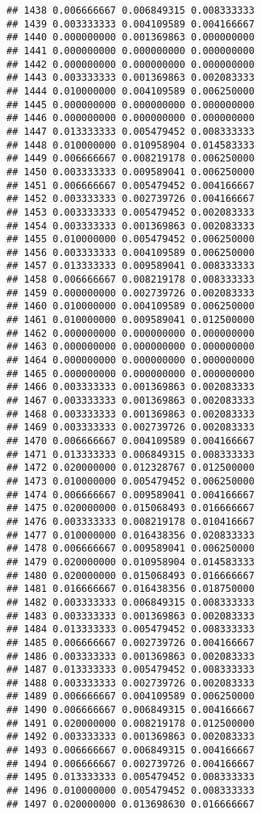 \documentclass[
]{article}
\begin{document}
\begin{verbatim}
## 1438 0.006666667 0.006849315 0.008333333
## 1439 0.003333333 0.004109589 0.004166667
## 1440 0.000000000 0.001369863 0.000000000
## 1441 0.000000000 0.000000000 0.000000000
## 1442 0.000000000 0.000000000 0.000000000
## 1443 0.003333333 0.001369863 0.002083333
## 1444 0.010000000 0.004109589 0.006250000
## 1445 0.000000000 0.000000000 0.000000000
## 1446 0.000000000 0.000000000 0.000000000
## 1447 0.013333333 0.005479452 0.008333333
## 1448 0.010000000 0.010958904 0.014583333
## 1449 0.006666667 0.008219178 0.006250000
## 1450 0.003333333 0.009589041 0.006250000
## 1451 0.006666667 0.005479452 0.004166667
## 1452 0.003333333 0.002739726 0.004166667
## 1453 0.003333333 0.005479452 0.002083333
## 1454 0.003333333 0.001369863 0.002083333
## 1455 0.010000000 0.005479452 0.006250000
## 1456 0.003333333 0.004109589 0.006250000
## 1457 0.013333333 0.009589041 0.008333333
## 1458 0.006666667 0.008219178 0.008333333
## 1459 0.000000000 0.002739726 0.002083333
## 1460 0.010000000 0.004109589 0.006250000
## 1461 0.010000000 0.009589041 0.012500000
## 1462 0.000000000 0.000000000 0.000000000
## 1463 0.000000000 0.000000000 0.000000000
## 1464 0.000000000 0.000000000 0.000000000
## 1465 0.000000000 0.000000000 0.000000000
## 1466 0.003333333 0.001369863 0.002083333
## 1467 0.003333333 0.001369863 0.002083333
## 1468 0.003333333 0.001369863 0.002083333
## 1469 0.003333333 0.002739726 0.002083333
## 1470 0.006666667 0.004109589 0.004166667
## 1471 0.013333333 0.006849315 0.008333333
## 1472 0.020000000 0.012328767 0.012500000
## 1473 0.010000000 0.005479452 0.006250000
## 1474 0.006666667 0.009589041 0.004166667
## 1475 0.020000000 0.015068493 0.016666667
## 1476 0.003333333 0.008219178 0.010416667
## 1477 0.010000000 0.016438356 0.020833333
## 1478 0.006666667 0.009589041 0.006250000
## 1479 0.020000000 0.010958904 0.014583333
## 1480 0.020000000 0.015068493 0.016666667
## 1481 0.016666667 0.016438356 0.018750000
## 1482 0.003333333 0.006849315 0.008333333
## 1483 0.003333333 0.001369863 0.002083333
## 1484 0.013333333 0.005479452 0.008333333
## 1485 0.006666667 0.002739726 0.004166667
## 1486 0.003333333 0.001369863 0.002083333
## 1487 0.013333333 0.005479452 0.008333333
## 1488 0.003333333 0.002739726 0.002083333
## 1489 0.006666667 0.004109589 0.006250000
## 1490 0.006666667 0.006849315 0.004166667
## 1491 0.020000000 0.008219178 0.012500000
## 1492 0.003333333 0.001369863 0.002083333
## 1493 0.006666667 0.006849315 0.004166667
## 1494 0.006666667 0.002739726 0.004166667
## 1495 0.013333333 0.005479452 0.008333333
## 1496 0.010000000 0.005479452 0.008333333
## 1497 0.020000000 0.013698630 0.016666667

\end{verbatim}
\end{document}
